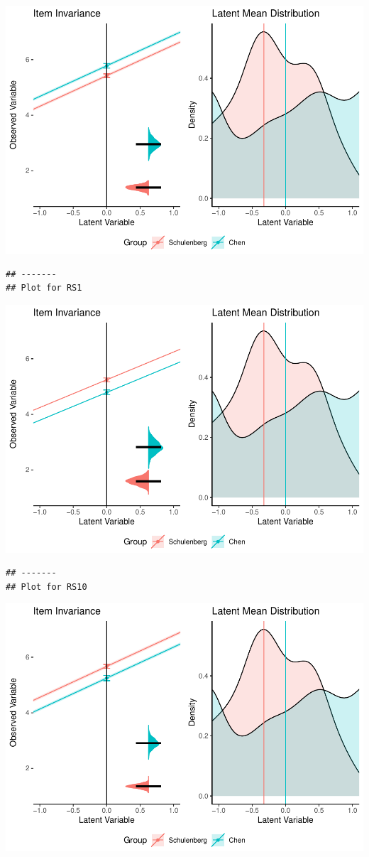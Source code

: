 \documentclass[
  man]{apa7}
\begin{document}
\includegraphics{manuscript_files/figure-latex/unnamed-chunk-103-5.pdf}

\begin{verbatim}
## -------
## Plot for RS1
\end{verbatim}

\includegraphics{manuscript_files/figure-latex/unnamed-chunk-103-6.pdf}

\begin{verbatim}
## -------
## Plot for RS10
\end{verbatim}

\includegraphics{manuscript_files/figure-latex/unnamed-chunk-103-7.pdf}
\end{document}

